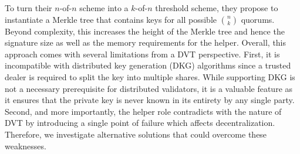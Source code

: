 To turn their $n$-of-$n$ scheme into a $k$-of-$n$ threshold scheme, they propose to instantiate a Merkle tree that contains keys for all possible $\binom{n}{k}$ quorums.
Beyond complexity, this increases the height of the Merkle tree and hence the signature size as well as the memory requirements for the helper.
Overall, this approach comes with several limitations from a DVT perspective.
First, it is incompatible with distributed key generation (DKG) algorithms since a trusted dealer is required to split the key into multiple shares.
While supporting DKG is not a necessary prerequisite for distributed validators, it is a valuable feature as it ensures that the private key is never known in its entirety by any single party.
Second, and more importantly, the helper role contradicts with the nature of DVT by introducing a single point of failure which affects decentralization.
Therefore, we investigate alternative solutions that could overcome these weaknesses.

